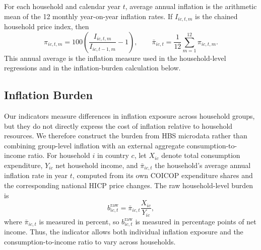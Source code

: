 \documentclass[11pt]{article}
\begin{document}
For each household and calendar year $t$, average annual inflation is the arithmetic mean of the 12
monthly year-on-year inflation rates. If $I_{ic,t,m}$ is the chained household price index, then
\begin{equation}
\pi_{ic,t,m}=100\left(\frac{I_{ic,t,m}}{I_{ic,t-1,m}}-1\right),
\qquad
\bar{\pi}_{ic,t}=\frac{1}{12}\sum_{m=1}^{12}\pi_{ic,t,m}.
\label{eq:average-annual-household-inflation}
\end{equation}
This annual average is the inflation measure used in the household-level regressions and in the
inflation-burden calculation below.


\subsection{Inflation Burden}

Our indicators measure differences in inflation exposure across household groups, but they do
not directly express the cost of inflation relative to household resources. We therefore construct
the burden from HBS microdata rather than combining group-level inflation with an external aggregate
consumption-to-income ratio. For household $i$ in country $c$, let $X_{ic}$ denote total consumption
expenditure, $Y_{ic}$ net household income, and $\bar{\pi}_{ic,t}$ the household's average annual
inflation rate in year $t$, computed from its own COICOP expenditure shares and the corresponding
national HICP price changes. The raw household-level burden is
\begin{equation}
b^{\mathrm{raw}}_{ic,t}=\bar{\pi}_{ic,t}\frac{X_{ic}}{Y_{ic}},
\label{eq:micro-inflation-burden}
\end{equation}
where $\bar{\pi}_{ic,t}$ is measured in percent, so $b^{\mathrm{raw}}_{ic,t}$ is measured in
percentage points of net income. Thus, the indicator allows both individual inflation exposure and
the consumption-to-income ratio to vary across households.
\end{document}
